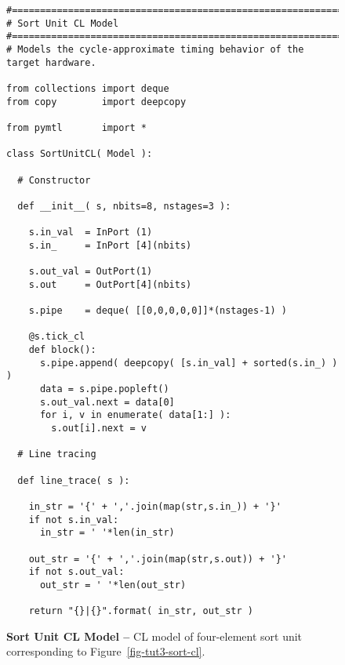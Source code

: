
\begin{figure}

  \begin{lstlisting}[xleftmargin={0.9in}]
#=========================================================================
# Sort Unit CL Model
#=========================================================================
# Models the cycle-approximate timing behavior of the target hardware.

from collections import deque
from copy        import deepcopy

from pymtl       import *

class SortUnitCL( Model ):

  # Constructor

  def __init__( s, nbits=8, nstages=3 ):

    s.in_val  = InPort (1)
    s.in_     = InPort [4](nbits)

    s.out_val = OutPort(1)
    s.out     = OutPort[4](nbits)

    s.pipe    = deque( [[0,0,0,0,0]]*(nstages-1) )

    @s.tick_cl
    def block():
      s.pipe.append( deepcopy( [s.in_val] + sorted(s.in_) ) )
      data = s.pipe.popleft()
      s.out_val.next = data[0]
      for i, v in enumerate( data[1:] ):
        s.out[i].next = v

  # Line tracing

  def line_trace( s ):

    in_str = '{' + ','.join(map(str,s.in_)) + '}'
    if not s.in_val:
      in_str = ' '*len(in_str)

    out_str = '{' + ','.join(map(str,s.out)) + '}'
    if not s.out_val:
      out_str = ' '*len(out_str)

    return "{}|{}".format( in_str, out_str )
\end{lstlisting}

  \caption{\textbf{Sort Unit CL Model --} CL model of four-element sort
    unit corresponding to Figure~\ref{fig-tut3-sort-cl}.}
  \label{code-tut3-sort-cl}

\end{figure}

